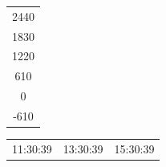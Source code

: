 \documentclass[UTF8,10pt,a4paper,fontset=fandol]{ctexart}
\begin{document}
\begin{center}
\begin{minipage}[t]{0.31\linewidth}
{\begin{minipage}[t][0.78\textheight][t]{0.92\linewidth}
\begin{center}
\begin{tabular}{c}
2440\\
1830\\
1220\\
610\\
0\\
-610
\end{tabular}

\vspace{1em}
\begin{tabular}{ccc}
11:30:39 & 13:30:39 & 15:30:39
\end{tabular}
\end{center}

\end{minipage}}
\end{minipage}
\hfill
\begin{minipage}[t]{0.31\linewidth}
\centering
\setlength{\fboxsep}{6pt}
\end{minipage}
\end{center}

\newpage
\end{document}
